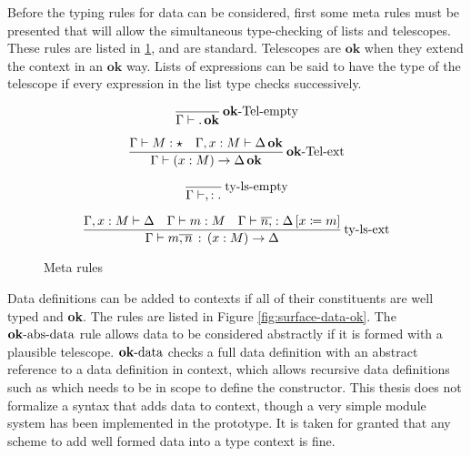 Before the typing rules for data can be considered, first some meta rules must be presented that will allow the simultaneous type-checking of lists and telescopes.
These rules are listed in \ref{fig:surface-data-meta-ty}, and are standard.
Telescopes are $\mathbf{ok}$ when they extend the context in an $\mathbf{ok}$ way.
Lists of expressions can be said to have the type of the telescope if every expression in the list type checks successively.

\begin{figure}
\[
\frac{
  \,
  }{\Gamma\vdash.\,\mathbf{ok}}\operatorname{\mathbf{ok}-Tel-empty}
\]

\[
\frac{
  \Gamma\vdash M:\star\quad\Gamma,x:M\vdash\Delta\,\mathbf{ok}
  }{\Gamma\vdash\left(x:M\right)\rightarrow\Delta\,\mathbf{ok}}\operatorname{\mathbf{ok}-Tel-ext}
\]

\[
\frac{
  \,
}{\Gamma\vdash,:.}\operatorname{ty-ls-empty}
\]

\[
\frac{
  \Gamma,x:M\vdash\Delta\quad\Gamma\vdash m:M\quad\Gamma\vdash\overline{n,} %
  :\Delta\left[x\coloneqq m\right]
  }{\Gamma\vdash m\overline{,n}\,:\,\left(x:M\right)\rightarrow\Delta}\rulename{ty-ls-ext}
\]

\caption{Meta rules}
\label{fig:surface-data-meta-ty}
\end{figure}

Data definitions can be added to contexts if all of their constituents are well typed and \textbf{ok}.
The rules are listed in Figure \ref{fig:surface-data-ok}.
The $\operatorname{\mathbf{ok}-abs-data}$ rule allows data to be considered abstractly if it is formed with a plausible telescope.
$\operatorname{\mathbf{ok}-data}$ checks a full data definition with an abstract reference to a data definition in context, which allows recursive data definitions such as \Nat{} which needs \Nat{} to be in scope to define the \Suc constructor.
This thesis does not formalize a syntax that adds data to context, though a very simple module system has been implemented in the prototype.
It is taken for granted that any scheme to add well formed data into a type context is fine.

